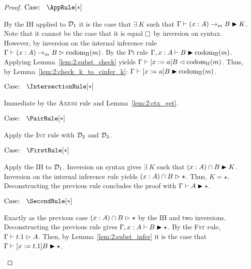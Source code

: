 \begin{proof}
    $\text{Case: }\begin{array}{c} \AppRule[*] \end{array}$
    \begin{proofcase}
        By the IH applied to $\mathcal{D}_{1}$ it is the case that $\exists\ K$ such that $\Gamma \vdash (x : A) \to_m B \blacktriangleright K$.
        Note that it cannot be the case that it is equal $\kind$ by inversion on syntax.
        However, by inversion on the internal inference rule $\Gamma \vdash (x : A) \to_m B \vartriangleright \mbox{\normalfont codom}_\Pi(m)$.
        By the \textsc{Pi} rule $\Gamma, x : A \vdash B \blacktriangleright \mbox{\normalfont codom}_\Pi(m)$.
        Applying Lemma~\ref{lem:2:subst_check} yields $\Gamma \vdash [x := a]B \vartriangleleft \mbox{\normalfont codom}_\Pi(m)$.
        Thus, by Lemma~\ref{lem:2:check_k_to_cinfer_k}: $\Gamma \vdash [x := a]B \blacktriangleright \mbox{\normalfont codom}_\Pi(m)$.
    \end{proofcase}

    $\text{Case: }\begin{array}{c} \IntersectionRule[*] \end{array}$
    \begin{proofcase}
        Immediate by the \textsc{Axiom} rule and Lemma~\ref{lem:2:ctx_get}.
    \end{proofcase}

    $\text{Case: }\begin{array}{c} \PairRule[*] \end{array}$
    \begin{proofcase}
        Apply the \textsc{Int} rule with $\mathcal{D}_{2}$ and $\mathcal{D}_{3}$.
    \end{proofcase}

    $\text{Case: }\begin{array}{c} \FirstRule[*] \end{array}$
    \begin{proofcase}
        Apply the IH to $\mathcal{D}_{1}$.
        Inversion on syntax gives $\exists\ K$ such that $(x : A) \cap B \blacktriangleright K$.
        Inversion on the internal inference rule yields $(x : A) \cap B \vartriangleright \star$.
        Thus, $K = \star$.
        Deconstructing the previous rule concludes the proof with $\Gamma \vdash A \blacktriangleright \star$.
    \end{proofcase}

    $\text{Case: }\begin{array}{c} \SecondRule[*] \end{array}$
    \begin{proofcase}
        Exactly as the previous case $(x : A) \cap B \vartriangleright \star$ by the IH and two inversions.
        Deconstructing the previous rule gives $\Gamma, x : A \vdash B \blacktriangleright \star$.
        By the \textsc{Fst} rule, $\Gamma \vdash t.1 \vartriangleright A$.
        Then, by Lemma~\ref{lem:2:subst_infer} it is the case that $\Gamma \vdash [x := t.1]B \blacktriangleright \star$.
    \end{proofcase}


\end{proof}
